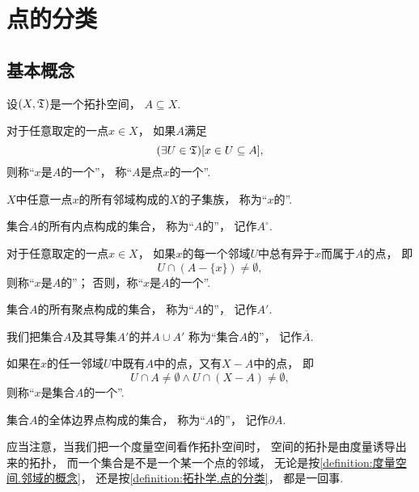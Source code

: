 \section{点的分类}
\subsection{基本概念}
\begin{definition}\label{definition:拓扑学.点的分类}
设\((X,\mathfrak T)\)是一个拓扑空间，
\(A \subseteq X\).

对于任意取定的一点\(x \in X\)，
如果\(A\)满足\[
	(\exists U\in\mathfrak T)
	[x \in U \subseteq A],
\]
则称“\(x\)是\(A\)的一个”，
称“\(A\)是点\(x\)的一个”.

\(X\)中任意一点\(x\)的所有邻域构成的\(X\)的子集族，
称为“\(x\)的”.

集合\(A\)的所有内点构成的集合，
称为“\(A\)的”，
记作\(A^\circ\).

对于任意取定的一点\(x \in X\)，
如果\(x\)的每一个邻域\(U\)中总有异于\(x\)而属于\(A\)的点，
即\[
	U \cap (A - \{x\}) \neq \emptyset,
\]
则称“\(x\)是\(A\)的”；
否则，称“\(x\)是\(A\)的一个”.

集合\(A\)的所有聚点构成的集合，
称为“\(A\)的”，
记作\(A'\).

我们把集合\(A\)及其导集\(A'\)的并\(A \cup A'\)
称为“集合\(A\)的”，
记作\(\overline{A}\).

如果在\(x\)的任一邻域\(U\)中既有\(A\)中的点，又有\(X - A\)中的点，
即\[
	U \cap A \neq \emptyset
	\land
	U \cap (X-A) \neq \emptyset,
\]
则称“\(x\)是集合\(A\)的一个”.

集合\(A\)的全体边界点构成的集合，
称为“\(A\)的”，
记作\(\partial A\).
\end{definition}

\begin{remark}
应当注意，当我们把一个度量空间看作拓扑空间时，
空间的拓扑是由度量诱导出来的拓扑，
而一个集合是不是一个某一个点的邻域，
无论是按\cref{definition:度量空间.邻域的概念}，
还是按\cref{definition:拓扑学.点的分类}，
都是一回事.
\end{remark}

